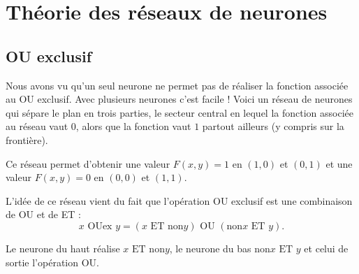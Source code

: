 \documentclass[11pt,class=report,crop=false]{standalone}
\begin{document}

\section{Théorie des réseaux de neurones}

\subsection{OU exclusif}

Nous avons vu qu'un seul neurone ne permet pas de réaliser la fonction associée au \og{}OU exclusif\fg{}.
Avec plusieurs neurones c'est facile !
Voici un réseau de neurones qui sépare le plan en trois parties, le secteur central en lequel la fonction associée au réseau vaut $0$, alors que la fonction vaut $1$ partout ailleurs (y compris sur la frontière).




Ce réseau permet d'obtenir une valeur $F(x,y)=1$ en $(1,0)$ et $(0,1)$ et une valeur $F(x,y)=0$ en $(0,0)$ et $(1,1)$.

L'idée de ce réseau vient du fait que l'opération \og{}OU exclusif\fg{} est une combinaison de \og{}OU\fg{} et de \og{}ET\fg{} :
$$x \text{ OUex } y  = (x \text{ ET } \text{non} y) \text{ OU } ( \text{non} x \text{ ET } y).$$


\begin{center}
\begin{minipage}{0.60\textwidth}
\end{minipage}
\begin{minipage}{0.39\textwidth}
\end{minipage}
\end{center}

Le neurone du haut réalise \og{}$x \text{ ET } \text{non} y$\fg{}, le neurone du bas \og{}$\text{non} x \text{ ET } y$\fg{} et celui de sortie l'opération \og{}OU\fg{}.

\end{document}
